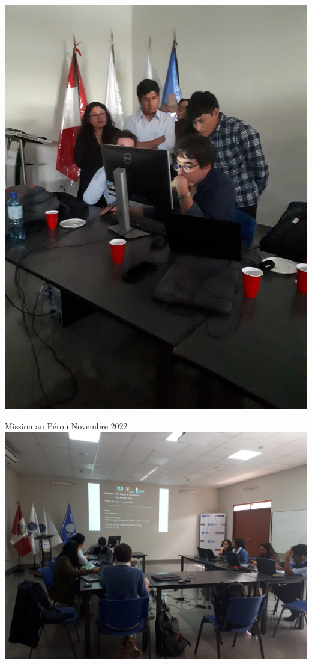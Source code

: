 \documentclass{beamer}
\begin{document}
\begin{frame}
\begin{center}
\begin{minipage}{0.3\linewidth}
   \includegraphics[width=1\linewidth]{images/Lima4}
  \end{minipage}
  \begin{minipage}{0.3\linewidth}
  \centering Mission au Pérou Novembre 2022 \\
  \vskip 1cm
   \includegraphics[width=1\linewidth]{images/Lima3}

\end{minipage}
\end{center}
\end{frame}
\end{document}
